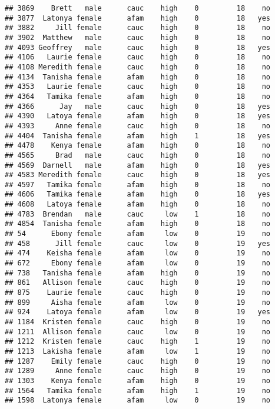 \documentclass[
]{article}
\begin{document}
\begin{verbatim}
## 3869    Brett   male      cauc    high    0         18    no
## 3877  Latonya female      afam    high    0         18   yes
## 3882     Jill female      cauc    high    0         18    no
## 3902  Matthew   male      cauc    high    0         18    no
## 4093 Geoffrey   male      cauc    high    0         18   yes
## 4106   Laurie female      cauc    high    0         18    no
## 4108 Meredith female      cauc    high    0         18    no
## 4134  Tanisha female      afam    high    0         18    no
## 4353   Laurie female      cauc    high    0         18    no
## 4364   Tamika female      afam    high    0         18    no
## 4366      Jay   male      cauc    high    0         18   yes
## 4390   Latoya female      afam    high    0         18   yes
## 4393     Anne female      cauc    high    0         18    no
## 4404  Tanisha female      afam    high    1         18   yes
## 4478    Kenya female      afam    high    0         18    no
## 4565     Brad   male      cauc    high    0         18    no
## 4569  Darnell   male      afam    high    0         18   yes
## 4583 Meredith female      cauc    high    0         18   yes
## 4597   Tamika female      afam    high    0         18    no
## 4606   Tamika female      afam    high    0         18   yes
## 4608   Latoya female      afam    high    0         18    no
## 4783  Brendan   male      cauc     low    1         18    no
## 4854  Tanisha female      afam    high    0         18    no
## 54      Ebony female      afam     low    0         19    no
## 458      Jill female      cauc     low    0         19   yes
## 474    Keisha female      afam     low    0         19    no
## 672     Ebony female      afam     low    0         19    no
## 738   Tanisha female      afam    high    0         19    no
## 861   Allison female      cauc    high    0         19    no
## 875    Laurie female      cauc    high    0         19    no
## 899     Aisha female      afam     low    0         19    no
## 924    Latoya female      afam     low    0         19   yes
## 1184  Kristen female      cauc    high    0         19    no
## 1211  Allison female      cauc     low    0         19    no
## 1212  Kristen female      cauc    high    1         19    no
## 1213  Lakisha female      afam     low    1         19    no
## 1287    Emily female      cauc    high    0         19    no
## 1289     Anne female      cauc    high    0         19    no
## 1303    Kenya female      afam    high    0         19    no
## 1564   Tamika female      afam    high    1         19    no
## 1598  Latonya female      afam     low    0         19    no

\end{verbatim}
\end{document}
